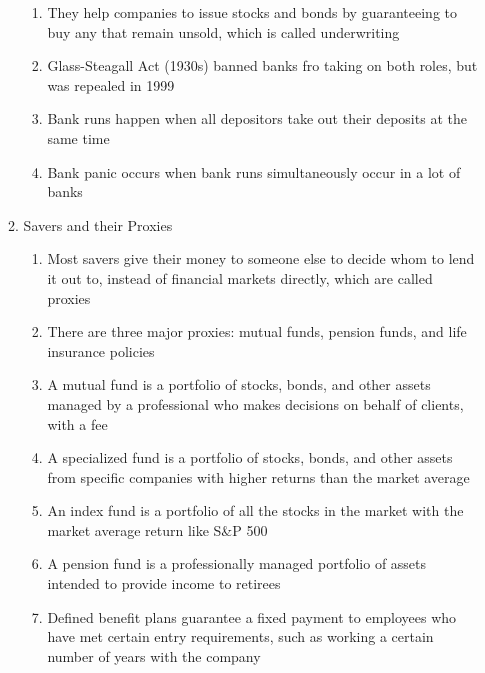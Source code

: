 \documentclass[12pt]{article}
\begin{document}
\begin{enumerate}
\begin{enumerate}
\begin{enumerate}
              \item They help companies to issue stocks and bonds by guaranteeing to buy any that remain unsold, which is called underwriting

              \item Glass-Steagall Act (1930s) banned banks fro taking on both roles, but was repealed in 1999

              \item Bank runs happen when all depositors take out their deposits at the same time

              \item Bank panic occurs when bank runs simultaneously occur in a lot of banks

            \end{enumerate}

          \item Savers and their Proxies

            \begin{enumerate}

              \item Most savers give their money to someone else to decide whom to lend it out to, instead of financial markets directly, which are called proxies

              \item There are three major proxies: mutual funds, pension funds, and life insurance policies

              \item A mutual fund is a portfolio of stocks, bonds, and other assets managed by a professional who makes decisions on behalf of clients, with a fee

              \item A specialized fund is a portfolio of stocks, bonds, and other assets from specific companies with higher returns than the market average

              \item An index fund is a portfolio of all the stocks in the market with the market average return like S\&P 500

              \item A pension fund is a professionally managed portfolio of assets intended to provide income to retirees

              \item Defined benefit plans guarantee a fixed payment to employees who have met certain entry requirements, such as working a certain number of years with the company


\end{enumerate}
\end{enumerate}
\end{enumerate}
\end{document}
